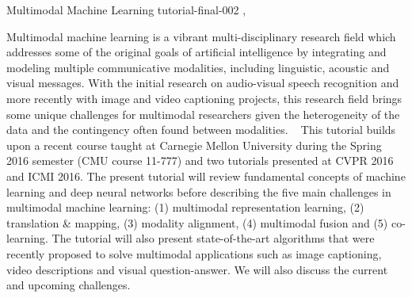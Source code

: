 \begin{tutorial}
  {Multimodal Machine Learning}
  {tutorial-final-002}
  {\daydateyear, \tutorialmorningtime}
  {\TutLocB}

Multimodal machine learning is a vibrant multi-disciplinary research field which addresses some of the original goals of artificial intelligence by integrating and modeling multiple communicative modalities, including linguistic, acoustic and visual messages. With the initial research on audio-visual speech recognition and more recently with image and video captioning projects, this research field brings some unique challenges for multimodal researchers given the heterogeneity of the data and the contingency often found between modalities.
 
This tutorial builds upon a recent course taught at Carnegie Mellon University during the Spring 2016 semester (CMU course 11-777) and two tutorials presented at CVPR 2016 and ICMI 2016. The present tutorial will review fundamental concepts of machine learning and deep neural networks before describing the five main challenges in multimodal machine learning: (1) multimodal representation learning, (2) translation & mapping, (3) modality alignment, (4) multimodal fusion and (5) co-learning. The tutorial will also present state-of-the-art algorithms that were recently proposed to solve multimodal applications such as image captioning, video descriptions and visual question-answer. We will also discuss the current and upcoming challenges.
\end{tutorial}
